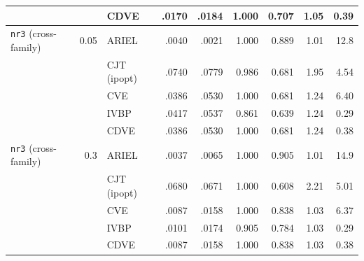 \begin{table}[htbp]
\begin{tabular}{lrlrrrrrr}
 &  & CDVE & .0170 & .0184 & 1.000 & 0.707 & 1.05 & 0.39 \\
\midrule
\texttt{nr3} (cross-family) & 0.05 & ARIEL & .0040 & .0021 & 1.000 & 0.889 & 1.01 & 12.8 \\
 &  & CJT (ipopt) & .0740 & .0779 & 0.986 & 0.681 & 1.95 & 4.54 \\
 &  & CVE & .0386 & .0530 & 1.000 & 0.681 & 1.24 & 6.40 \\
 &  & IVBP & .0417 & .0537 & 0.861 & 0.639 & 1.24 & 0.29 \\
 &  & CDVE & .0386 & .0530 & 1.000 & 0.681 & 1.24 & 0.38 \\
\midrule
\texttt{nr3} (cross-family) & 0.3 & ARIEL & .0037 & .0065 & 1.000 & 0.905 & 1.01 & 14.9 \\
 &  & CJT (ipopt) & .0680 & .0671 & 1.000 & 0.608 & 2.21 & 5.01 \\
 &  & CVE & .0087 & .0158 & 1.000 & 0.838 & 1.03 & 6.37 \\
 &  & IVBP & .0101 & .0174 & 0.905 & 0.784 & 1.03 & 0.29 \\
 &  & CDVE & .0087 & .0158 & 1.000 & 0.838 & 1.03 & 0.38 \\
\bottomrule
\end{tabular}
\end{table}
